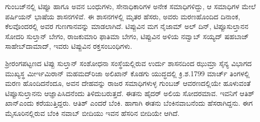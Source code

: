 ಗುಂಬಜ್​ನಲ್ಲಿ ಟಿಪ್ಪೂ ಹಾಗೂ ಅವನ ಬಂಧುಗಳು, ಸೇನಾಧಿಕಾರಿಗಳ ಅನೇಕ ಸಮಾಧಿಗಳಿದ್ದು, ಆ ಸಮಾಧಿಗಳ ಮೇಲೆ ಪರ್ಷಿಯನ್​ ಭಾಷೆಯ ಶಾಸನಗಳಿವೆ. ಈ ಶಾಸನಗಳಲ್ಲಿ ಮೃತರ ಹೆಸರು, ಅವರು ಮರಣಹೊಂದಿದ ದಿನಾಂಕ, ಕೆಲವೊಂದರಲ್ಲಿ ಅವರ ಗುಣಗಾನವನ್ನು ಮಾಡಲಾಗಿದೆ. ಟಿಪ್ಪುವಿನ ಮಗ ನೈಜಾಮ್ ಅಲ್​ ದಿನ್​, ಟಿಪ್ಪೂಸುಲ್ತಾನನ ಸೋದರಿ ಸುಲ್ತಾನ್​ ಬೇಗಂ, ರಾಜಕುಮಾರಿ ಫಾತಿಮಾ ಬೇಗಂ, ಟಿಪ್ಪುವಿನ ಅಳಿಯ ನವ್ವಾಬ್​ ಸಯ್ಯದ್​ ಷಹಬಾಜ್​ ಸಾಹೇಬ್​ ದಾಮಾದ್​, ಇವರು ಟಿಪ್ಪುವಿನ ರಕ್ತಸಂಬಂಧಿಗಳು.

ಶ‍್ರೀರಂಗಪಟ್ಟಣದ ಟಿಪ್ಪು ಸುಲ್ತಾನ್​ ಸಂಶೋಧನಾ ಸಂಸ್ಥೆಯಲ್ಲಿರುವ ಉರ್ದು ಶಾಸನದಿಂದ ಝುಮ್ರಾ ಸೈನ್ಯ ವಿಭಾಗದ ಮುಖ್ಯಸ್ಥ ಮೀರ್ಇ\enginline{-}ಮಿರಾನ್​ ಮಹಮದ್​ರಿಜಾ ಅಲಿಖಾನ್​ ಕೊಡಗು ಯುದ್ಧದಲ್ಲಿ ಕ್ರಿ.ಶ.1799 ಮಾರ್ಚ್ ತಿಂಗಳಲ್ಲಿ ಮರಣ ಹೊಂದಿದನೆಂದೂ, ಅವನ ದೇಹವನ್ನು ರಾಜರ ಸಮಾಧಿಗಳುಳ್ಳ ಗುಂಬಜ್​ ಆವರಣದಲ್ಲಿಯೇ ಹೂಳುವಂತೆ ಟಿಪ್ಪೂಸುಲ್ತಾನನು ಆಜ್ಞಾಪಿಸಿದನೆಂದು ತಿಳಿದುಬರುತ್ತದೆ. ಈತನು ಹೈದರ್​ ಅಲಿಯ ಸೋದರಮಾವ. ಇವನಿಗೆ ಆತಿಶ್​ಖಾನ್​ ಎಂದು ಕರೆಯುತ್ತಿದ್ದರು. ಆತಿಶ್​ ಎಂದರೆ ಬೆಂಕಿ. ಹಾಗಾಗಿ ಈತನು ಬೆಂಕಿನವಾಬನೆಂದು ಹೆಸರಾಗಿದ್ದನು. ಈಗ ಮೈಸೂರಿನಲ್ಲಿರುವ ಬೆಂಕಿ ನವಾಬ್​ ಬೀದಿಯು ಇವನ ಹೆಸರಿನ ಬೀದಿಯೇ ಆಗಿದೆ.

